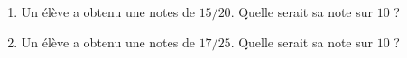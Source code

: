 
\begin{exercice}\label{exosmath-0946}

    \begin{enumerate}
        \item
            Un élève a obtenu une notes de \( 15/20\). Quelle serait sa note sur \( 10\) ?
        \item
            Un élève a obtenu une notes de \( 17/25\). Quelle serait sa note sur \( 10\) ?
    \end{enumerate}

\end{exercice}
